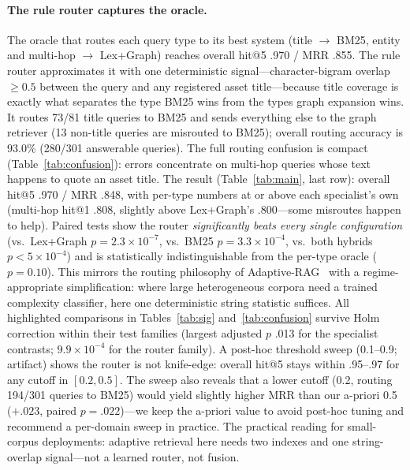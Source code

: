 \documentclass[runningheads]{llncs}
\begin{document}
\paragraph{The rule router captures the oracle.} The oracle that routes each
query type to its best system (title $\to$ BM25, entity and multi-hop $\to$
Lex+Graph) reaches overall hit@5 .970 / MRR .855. The rule router approximates
it with one deterministic signal---character-bigram overlap ${\ge}0.5$
between the query and any registered asset title---because title coverage is
exactly what separates the type BM25 wins from the types graph expansion
wins. It routes 73/81 title queries to BM25 and sends everything else to the
graph retriever (13 non-title queries are misrouted to BM25); overall routing
accuracy is 93.0\% (280/301 answerable queries). The full routing confusion
is compact (Table~\ref{tab:confusion}): errors concentrate on multi-hop
queries whose text happens to quote an asset title. The result
(Table~\ref{tab:main}, last row): overall hit@5 .970 / MRR .848, with
per-type numbers at or above each specialist's own (multi-hop hit@1 .808,
slightly above Lex+Graph's .800---some misroutes happen to help). Paired
tests show the router \emph{significantly beats every single configuration}
(vs.\ Lex+Graph $p{=}2.3{\times}10^{-7}$, vs.\ BM25 $p{=}3.3{\times}10^{-4}$,
vs.\ both hybrids $p{<}5{\times}10^{-4}$) and is statistically
indistinguishable from the per-type oracle ($p{=}0.10$). This mirrors the
routing philosophy of Adaptive-RAG~\cite{adaptiverag} with a regime-
appropriate simplification: where large heterogeneous corpora need a trained
complexity classifier, here one deterministic string statistic suffices. All
highlighted
comparisons in Tables~\ref{tab:sig} and~\ref{tab:confusion} survive Holm
correction within their test families (largest adjusted $p$ .013 for the
specialist contrasts; $9.9{\times}10^{-4}$ for the router family). A post-hoc
threshold sweep (0.1--0.9; artifact) shows the router is not knife-edge:
overall hit@5 stays within .95--.97 for any cutoff in $[0.2, 0.5]$. The sweep
also reveals that a lower cutoff (0.2, routing 194/301 queries to BM25) would
yield slightly higher MRR than our a-priori 0.5 ($+.023$, paired
$p{=}.022$)---we keep the a-priori value to avoid post-hoc tuning and
recommend a per-domain sweep in practice. The practical
reading for small-corpus deployments: adaptive retrieval here
needs two indexes and one string-overlap signal---not a learned router, not
fusion.
\end{document}
